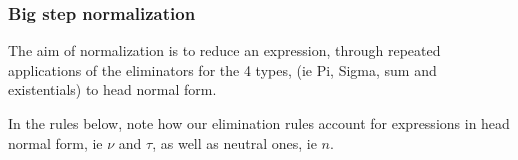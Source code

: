 \documentclass{article}
\begin{document}

\subsubsection{Big step normalization}

The aim of normalization is to reduce an
expression, through repeated applications of the eliminators for the 4 types,
(ie Pi, Sigma, sum and existentials) to head normal form.



In the rules below, note how our elimination rules account for expressions
in head normal form, ie $\nu$ and $\tau$, as well as neutral ones, ie $n$.

\end{document}
